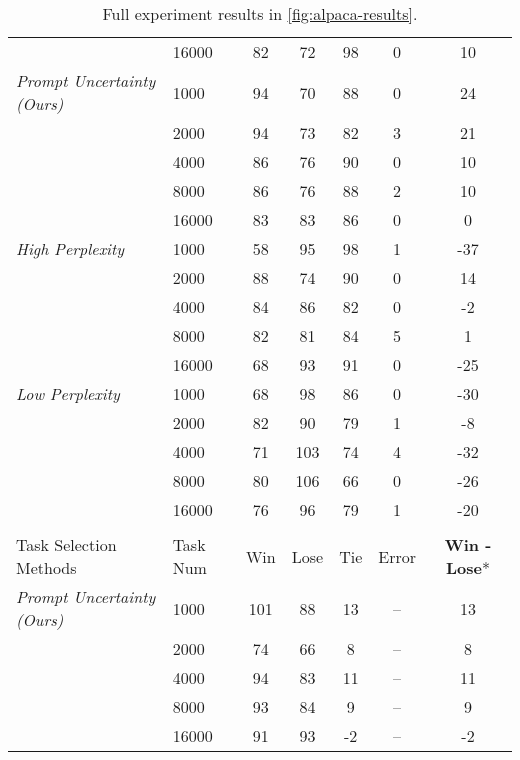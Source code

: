 \begin{table*}[h]
{\begin{NiceTabular}{llccccc}
& 16000 & 82 & 72 & 98 & 0 & 10 \\
\textit{Prompt Uncertainty (Ours)} 
& 1000 & 94 & 70 & 88 & 0 & 24 \\
& 2000 & 94 & 73 & 82 & 3 & 21 \\
& 4000 & 86 & 76 & 90 & 0 & 10 \\
& 8000 & 86 & 76 & 88 & 2 & 10 \\
& 16000 & 83 & 83 & 86 & 0 & 0 \\
\textit{High Perplexity} 
& 1000 & 58 & 95 & 98 & 1 & -37 \\
& 2000 & 88 & 74 & 90 & 0 & 14 \\
& 4000 & 84 & 86 & 82 & 0 & -2 \\
& 8000 & 82 & 81 & 84 & 5 & 1 \\
& 16000 & 68 & 93 & 91 & 0 & -25 \\
\textit{Low Perplexity} 
& 1000 & 68 & 98 & 86 & 0 & -30 \\
& 2000 & 82 & 90 & 79 & 1 & -8 \\
& 4000 & 71 & 103 & 74 & 4 & -32 \\
& 8000 & 80 & 106 & 66 & 0 & -26 \\
& 16000 & 76 & 96 & 79 & 1 & -20 \\
\hline
{} \\
Task Selection Methods & Task Num	& Win & Lose & Tie & Error & \textbf{Win - Lose}* \\
\hline
\textit{Prompt Uncertainty (Ours)} 
& 1000 & 101 & 88 & 13 & -- & 13 \\
& 2000 & 74 & 66 & 8 & -- & 8 \\
& 4000 & 94 & 83 & 11 & -- & 11 \\
& 8000 & 93 & 84 & 9 & -- & 9 \\
& 16000 & 91 & 93 & -2 & -- & -2 \\
\hline
\end{NiceTabular}%
}
\caption{Full experiment results in \autoref{fig:alpaca-results}.}
\label{tab:full-results-alpaca}
\end{table*}
